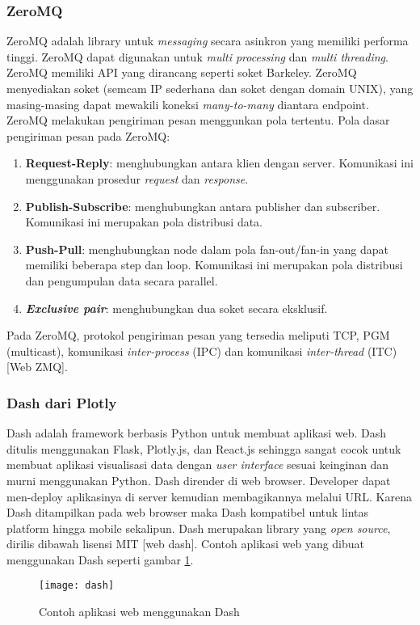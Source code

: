 \documentclass[../thesis.tex]{subfiles}
\begin{document}
\subsubsection{ZeroMQ}
ZeroMQ adalah library untuk \textit{messaging} secara asinkron yang memiliki performa tinggi. ZeroMQ dapat digunakan untuk \textit{multi processing} dan \textit{multi threading}.
ZeroMQ memiliki API yang dirancang seperti soket Barkeley.
ZeroMQ menyediakan soket (semcam IP sederhana dan soket dengan domain UNIX), yang masing-masing dapat mewakili koneksi \textit{many-to-many} diantara endpoint. ZeroMQ melakukan pengiriman pesan menggunkan pola tertentu.
Pola dasar pengiriman pesan pada ZeroMQ:
\begin{enumerate}
	\item \textbf{Request-Reply}: menghubungkan antara klien dengan server. Komunikasi ini menggunakan prosedur \textit{request} dan \textit{response}.
	\item \textbf{Publish-Subscribe}: menghubungkan antara publisher dan subscriber. Komunikasi ini merupakan pola distribusi data.
	\item \textbf{Push-Pull}: menghubungkan node dalam pola fan-out/fan-in yang dapat memiliki beberapa step dan loop. Komunikasi ini merupakan pola distribusi dan pengumpulan data secara parallel. 
	\item \textbf{\textit{Exclusive pair}}: menghubungkan dua soket secara eksklusif.
\end{enumerate}
Pada ZeroMQ, protokol pengiriman pesan yang tersedia meliputi TCP, PGM (multicast), komunikasi \textit{inter-process} (IPC) dan komunikasi \textit{inter-thread} (ITC) [Web ZMQ].

\subsubsection{Dash dari Plotly}
Dash adalah framework berbasis Python untuk membuat aplikasi web. Dash ditulis menggunakan Flask, Plotly.js, dan React.js sehingga sangat cocok untuk membuat aplikasi visualisasi data dengan \textit{user interface} sesuai keinginan dan murni menggunakan Python. 
Dash dirender di web browser. Developer dapat men-deploy aplikasinya di server kemudian membagikannya melalui URL. Karena Dash ditampilkan pada web browser maka Dash kompatibel untuk lintas platform hingga mobile sekalipun. 
Dash merupakan library yang \textit{open source}, dirilis dibawah lisensi MIT [web dash]. Contoh aplikasi web yang dibuat menggunakan Dash seperti gambar \ref{Dash}.
\begin{figure}[htp]
	\centering
	\texttt{[image: dash]}
	\caption{Contoh aplikasi web menggunakan Dash}
	\label{Dash}
\end{figure}
\end{document}
